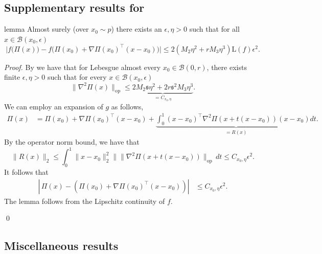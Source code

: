 \documentclass[11pt]{article}
\begin{document}
\begin{appendices}
\subsection{Supplementary results for }

\begin{restatable}[Approximation]{lemma}{} \label{lemma: proj approx}
    Almost surely (over $x_0 \sim p$) there exists an $\epsilon, \eta > 0$ such that for all $x \in \mathcal{B}(x_0, \epsilon)$
    \[\bigg|f\big(\Pi(x)\big) - f\big(\Pi(x_0) + \nabla \Pi(x_0)^{\top}(x-x_0) \big)\bigg| \le 2(M_2\eta^2+rM_3\eta^3)\text{L}(f)\epsilon^2. \]
\end{restatable}

\noindent \textit{Proof.} By  we have that for Lebesgue almost every $x_0 \in \mathcal{B}(0,r)$, there exists finite $\epsilon, \eta > 0$ such that for every $x \in \mathcal{B}(x_0, \epsilon)$
\[\|\nabla^2\Pi(x)\|_{\operatorname{op}} \leq \underbrace{2M_2\mathfrak s\eta^{2}+2r \mathfrak s^2M_3\eta^3}_{= C_{x_0, \eta}}.\]
We can employ an expansion of $g$ as follows,
\begin{align*}
    \Pi(x) &= \Pi(x_0) + \nabla \Pi(x_0)^{\top}(x-x_0) + \underbrace{\int_{0}^{1}(x-x_0)^{\top}\nabla^2\Pi(x+t(x-x_0))(x-x_0) dt}_{= R(x)}.
\end{align*}
By the operator norm bound, we have that
\[\|R(x)\|_2 \leq \int_{0}^{1}\|x - x_0\|_2^2\|\|\nabla^2\Pi(x+t(x-x_0))\|_{\operatorname{op}} \,dt \leq C_{x_0, \eta}\epsilon^2.\]
It follows that 
\begin{align}
    \left|\,\Pi(x) - \left(\Pi(x_0) + \nabla\Pi(x_0)^{\top}(x-x_0)\right)\right| &\leq C_{x_0, \eta}\epsilon^2. \label{projection second order bound curve}
\end{align}
The lemma follows from the Lipschitz continuity of $f$. 

\qed{}

\subsection{Miscellaneous results}


\end{appendices}
\end{document}
